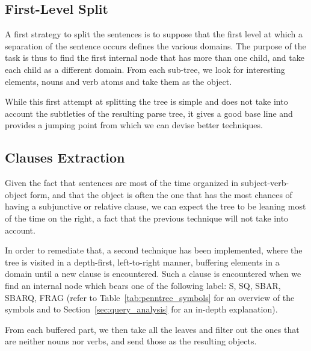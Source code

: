 
\subsection{First-Level Split} %
\label{sub:first_level_split}

A first strategy to split the sentences is to suppose that the first level at which a separation of the sentence occurs defines the various domains. The purpose of the task is thus to find the first internal node that has more than one child, and take each child as a different domain. From each sub-tree, we look for interesting elements, nouns and verb atoms and take them as the object.

While this first attempt at splitting the tree is simple and does not take into account the subtleties of the resulting parse tree, it gives a good base line and provides a jumping point from which we can devise better techniques.


\subsection{Clauses Extraction} %
\label{sub:clauses_extraction}

Given the fact that sentences are most of the time organized in subject-verb-object form, and that the object is often the one that has the most chances of having a subjunctive or relative clause, we can expect the tree to be leaning most of the time on the right, a fact that the previous technique will not take into account.

In order to remediate that, a second technique has been implemented, where the tree is visited in a depth-first, left-to-right manner, buffering elements in a domain until a new clause is encountered. Such a clause is encountered when we find an internal node which bears one of the following label: S, SQ, SBAR, SBARQ, FRAG (refer to Table~\ref{tab:penntree_symbols} for an overview of the symbols and to Section~\ref{sec:query_analysis} for an in-depth explanation).

From each buffered part, we then take all the leaves and filter out the ones that are neither nouns nor verbs, and send those as the resulting objects.



